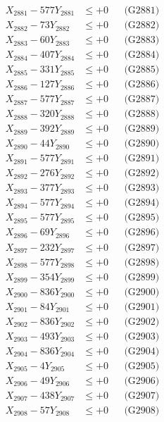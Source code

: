 \documentclass[a4paper,10pt]{article}
\begin{document}
{\begin{align}
\allowbreak
X_{2881} - 577Y_{2881} &\leq +0 && \text{(G2881)} \\
X_{2882} - 73Y_{2882} &\leq +0 && \text{(G2882)} \\
X_{2883} - 60Y_{2883} &\leq +0 && \text{(G2883)} \\
X_{2884} - 407Y_{2884} &\leq +0 && \text{(G2884)} \\
X_{2885} - 331Y_{2885} &\leq +0 && \text{(G2885)} \\
X_{2886} - 127Y_{2886} &\leq +0 && \text{(G2886)} \\
X_{2887} - 577Y_{2887} &\leq +0 && \text{(G2887)} \\
X_{2888} - 320Y_{2888} &\leq +0 && \text{(G2888)} \\
X_{2889} - 392Y_{2889} &\leq +0 && \text{(G2889)} \\
X_{2890} - 44Y_{2890} &\leq +0 && \text{(G2890)} \\
\allowbreak
X_{2891} - 577Y_{2891} &\leq +0 && \text{(G2891)} \\
X_{2892} - 276Y_{2892} &\leq +0 && \text{(G2892)} \\
X_{2893} - 377Y_{2893} &\leq +0 && \text{(G2893)} \\
X_{2894} - 577Y_{2894} &\leq +0 && \text{(G2894)} \\
X_{2895} - 577Y_{2895} &\leq +0 && \text{(G2895)} \\
X_{2896} - 69Y_{2896} &\leq +0 && \text{(G2896)} \\
X_{2897} - 232Y_{2897} &\leq +0 && \text{(G2897)} \\
X_{2898} - 577Y_{2898} &\leq +0 && \text{(G2898)} \\
X_{2899} - 354Y_{2899} &\leq +0 && \text{(G2899)} \\
X_{2900} - 836Y_{2900} &\leq +0 && \text{(G2900)} \\
\allowbreak
X_{2901} - 84Y_{2901} &\leq +0 && \text{(G2901)} \\
X_{2902} - 836Y_{2902} &\leq +0 && \text{(G2902)} \\
X_{2903} - 493Y_{2903} &\leq +0 && \text{(G2903)} \\
X_{2904} - 836Y_{2904} &\leq +0 && \text{(G2904)} \\
X_{2905} - 4Y_{2905} &\leq +0 && \text{(G2905)} \\
X_{2906} - 49Y_{2906} &\leq +0 && \text{(G2906)} \\
X_{2907} - 438Y_{2907} &\leq +0 && \text{(G2907)} \\
X_{2908} - 57Y_{2908} &\leq +0 && \text{(G2908)} \\

\end{align}}
\end{document}
